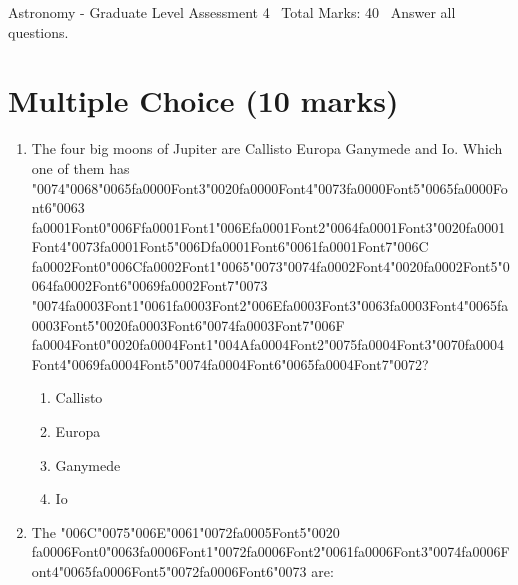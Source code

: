\documentclass[12pt]{article}
\begin{document}
\begin{center}
Astronomy - Graduate Level Assessment 4 \
Total Marks: 40 \
Answer all questions.
\end{center}

\section*{Multiple Choice (10 marks)}
\begin{enumerate}[label=\arabic*.]
\item The four big moons of Jupiter are Callisto Europa Ganymede and Io. Which one of them has
{\char"0074}{\char"0068}{\char"0065}{\csname fa0000Font3\endcsname\char"0020}{\csname fa0000Font4\endcsname\char"0073}{\csname fa0000Font5\endcsname\char"0065}{\csname fa0000Font6\endcsname\char"0063} {\csname fa0001Font0\endcsname\char"006F}{\csname fa0001Font1\endcsname\char"006E}{\csname fa0001Font2\endcsname\char"0064}{\csname fa0001Font3\endcsname\char"0020}{\csname fa0001Font4\endcsname\char"0073}{\csname fa0001Font5\endcsname\char"006D}{\csname fa0001Font6\endcsname\char"0061}{\csname fa0001Font7\endcsname\char"006C} {\csname fa0002Font0\endcsname\char"006C}{\csname fa0002Font1\endcsname\char"0065}{\char"0073}{\char"0074}{\csname fa0002Font4\endcsname\char"0020}{\csname fa0002Font5\endcsname\char"0064}{\csname fa0002Font6\endcsname\char"0069}{\csname fa0002Font7\endcsname\char"0073} {\char"0074}{\csname fa0003Font1\endcsname\char"0061}{\csname fa0003Font2\endcsname\char"006E}{\csname fa0003Font3\endcsname\char"0063}{\csname fa0003Font4\endcsname\char"0065}{\csname fa0003Font5\endcsname\char"0020}{\csname fa0003Font6\endcsname\char"0074}{\csname fa0003Font7\endcsname\char"006F} {\csname fa0004Font0\endcsname\char"0020}{\csname fa0004Font1\endcsname\char"004A}{\csname fa0004Font2\endcsname\char"0075}{\csname fa0004Font3\endcsname\char"0070}{\csname fa0004Font4\endcsname\char"0069}{\csname fa0004Font5\endcsname\char"0074}{\csname fa0004Font6\endcsname\char"0065}{\csname fa0004Font7\endcsname\char"0072}?
\begin{enumerate}[label=(\alph*)]
    \item Callisto
    \item Europa
    \item Ganymede
    \item Io
\end{enumerate}
\item The {\char"006C}{\char"0075}{\char"006E}{\char"0061}{\char"0072}{\csname fa0005Font5\endcsname\char"0020} {\csname fa0006Font0\endcsname\char"0063}{\csname fa0006Font1\endcsname\char"0072}{\csname fa0006Font2\endcsname\char"0061}{\csname fa0006Font3\endcsname\char"0074}{\csname fa0006Font4\endcsname\char"0065}{\csname fa0006Font5\endcsname\char"0072}{\csname fa0006Font6\endcsname\char"0073} are:

\end{enumerate}
\end{document}
